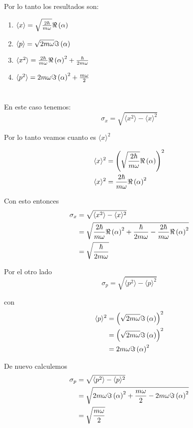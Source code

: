 \documentclass{report}
\newcommand{\inangle}[1]{\langle#1\rangle}
\begin{document}
Por lo tanto los resultados son:
\begin{enumerate}
  \item $\langle x \rangle = \sqrt{\frac{2\hbar}{m\omega}} \Re\left(\alpha\right)$
  \item $\langle p \rangle = \sqrt{2 m\omega}\Im\left(\alpha\right)$
  \item $\langle x^2 \rangle = \frac{2\hbar}{m\omega}\Re \left(\alpha\right)^2 + \frac{\hbar}{2m\omega}$
  \item $\langle p^2 \rangle = 2m\omega\Im\left(\alpha\right)^2 + \frac{m\omega}{2}$
\end{enumerate}

\pagebreak

\section{}

En este caso tenemos:
\[
  \sigma_x = \sqrt{\inangle{x^2} - \inangle{x}^2}
\]

Por lo tanto veamos cuanto es $\inangle{x}^2$

\begin{align*}
  \inangle{x}^2 &= \paren{\sqrt{\frac{2\hbar}{m\omega}} \Re\paren{\alpha}}^2\\
  \inangle{x}^2 &= \frac{2\hbar}{m\omega} \Re\paren{\alpha}^2
\end{align*}

Con esto entonces
\begin{align*}
  \sigma_x &= \sqrt{\inangle{x^2} - \inangle{x}^2}\\
  &= \sqrt{\frac{2\hbar}{m\omega}\Re \paren{\alpha}^2 + \frac{\hbar}{2m\omega} - \frac{2\hbar}{m\omega} \Re\paren{\alpha}^2}\\
  &= \sqrt{\frac{\hbar}{2m\omega}}
\end{align*}

Por el otro lado
\[
  \sigma_p = \sqrt{\inangle{p^2} - \inangle{p}^2}
\]

con
\begin{align*}
  \inangle{p}^2 &= \paren{\sqrt{2 m\omega}\Im\paren{\alpha}}^2\\
   &= \paren{\sqrt{2 m\omega}\Im\paren{\alpha}}^2\\
   &= 2 m\omega\Im\paren{\alpha}^2\\
\end{align*}

De nuevo calculemos
\begin{align*}
  \sigma_p &= \sqrt{\inangle{p^2} - \inangle{p}^2}\\
  &= \sqrt{2m\omega\Im\paren{\alpha}^2 + \frac{m\omega}{2} - 2 m\omega\Im\paren{\alpha}^2}\\
  &= \sqrt{\frac{m\omega}{2}}
\end{align*}
\end{document}
